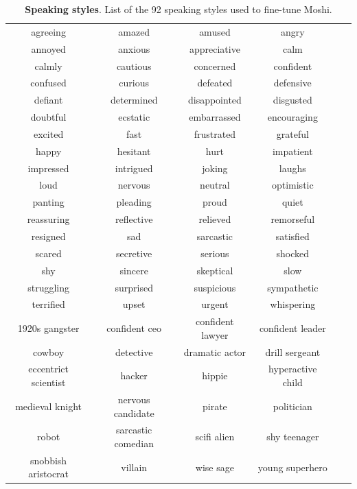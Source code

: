\begin{table}
  \centering
  \caption{\textbf{Speaking styles}. List of the 92 speaking styles used to fine-tune Moshi.}
  \label{tab:list_voices}
  \footnotesize
  \begin{tabular}{cccccc}
    \toprule
agreeing & amazed & amused & angry \\
annoyed & anxious & appreciative & calm \\
calmly & cautious & concerned & confident \\
confused & curious & defeated & defensive \\
defiant & determined & disappointed & disgusted \\
doubtful & ecstatic & embarrassed & encouraging \\
excited & fast & frustrated & grateful \\
happy & hesitant & hurt & impatient \\
impressed & intrigued & joking & laughs \\
loud & nervous & neutral & optimistic \\
panting & pleading & proud & quiet \\
reassuring & reflective & relieved & remorseful \\
resigned & sad & sarcastic & satisfied \\
scared & secretive & serious & shocked \\
shy & sincere & skeptical & slow \\
struggling & surprised & suspicious & sympathetic \\
terrified & upset & urgent & whispering \\
1920s gangster & confident ceo & confident lawyer & confident leader \\
cowboy & detective & dramatic actor & drill sergeant \\
eccentrict scientist & hacker & hippie & hyperactive child \\
medieval knight & nervous candidate & pirate & politician \\
robot & sarcastic comedian & scifi alien & shy teenager \\
snobbish aristocrat & villain & wise sage & young superhero \\
    \bottomrule
  \end{tabular}
\end{table}

